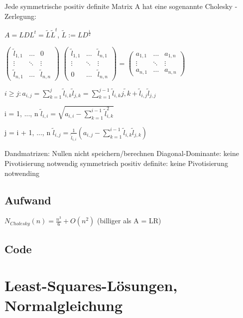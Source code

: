 \documentclass[12pt,a4paper]{article} %
\newcommand*\tab[1][1cm]{\hspace*{#1}}
\begin{document}
	Jede symmetrische positiv definite Matrix A hat eine sogenannte Cholesky - Zerlegung:
	
	$A = LDL^t = \tilde{L}\tilde{L}^t$, $\tilde{L} := LD^{\frac{1}{2}}$
	
	$\begin{pmatrix}
		\tilde{l}_{1,1} & \dots & 0 \\
		\vdots & \ddots & \vdots \\
		\tilde{l}_{n,1} & \dots & \tilde{l}_{n,n}
	\end{pmatrix}$
	$\begin{pmatrix}
		\tilde{l}_{1,1} & \dots & \tilde{l}_{n,1} \\
		\vdots & \ddots & \vdots \\
		0 & \dots & \tilde{l}_{n,n}
	\end{pmatrix}$
	=
	$\begin{pmatrix}
		a_{1,1} & \dots & a_{1, n} \\
		\vdots & \ddots & \vdots \\
		a_{n, 1} & \dots & a_{n, n}
	\end{pmatrix}$
	
	$i \ge j: a_{i, j} = \sum\limits_{k = 1}^j\tilde{l}_{i, k}\tilde{l}_{j, k} = \sum\limits_{k = 1}^{j - 1}\tilde{l}_{i, k}\tilde{j, k} + \tilde{l}_{i, j}\tilde{l}_{j, j}$
	
	i = 1, ..., n \tab $\tilde{l}_{i, i} = \sqrt{a_{i, i} - \sum\limits_{k = 1}^{i - 1}\tilde{l}_{i, k}^2}$
	
	j = i + 1, ..., n \tab $ \tilde{l}_{i, j} = \frac{1}{\tilde{l}_{i, i}}(a_{i, j} - \sum\limits_{k = 1}^{i - 1}\tilde{l}_{i, k}\tilde{l}_{j, k})$
	
	Dandmatrizen: Nullen nicht speichern/berechnen Diagonal-Dominante: keine Pivotisierung notwendig symmetrisch positiv definite: keine Pivotisierung notwending
	
	\subsection{Aufwand}
	
	$N_{Cholesky}(n) = \frac{n^3}{6} + O(n^2)$ \tab (billiger als A = LR)
	
	\subsection{Code}
	
	\newpage
	
	\section{Least-Squares-Lösungen, Normalgleichung}
	
\end{document}
